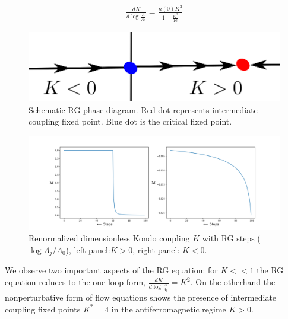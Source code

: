 \documentclass[aps,prl,preprint,groupedaddress]{revtex4-2}
\begin{document}
\begin{eqnarray}
\frac{d K}{d\log\frac{\Lambda}{\Lambda_{0}}}=\frac{n(0)K^{2}}{1-\frac{K^{2}}{16}}
\end{eqnarray}
\begin{figure}[h!]
\centering
\includegraphics[scale=0.6]{Kondo.png}
\caption{Schematic RG phase diagram. Red dot represents intermediate coupling fixed point. Blue dot is the critical fixed point.} 
\end{figure}
\begin{figure}
\centering
\includegraphics[width=\textwidth]{RG_Flow.png}
\caption{Renormalized dimensionless Kondo coupling $K$ with RG steps ($\log\Lambda_{j}/\Lambda_{0}$), left panel:$K>0$, right panel: $K<0$.} 
\end{figure}
We observe two important aspects of the RG equation: for $K<<1$ the RG equation reduces to the one loop form, $\frac{d K}{d\log\frac{\Lambda}{\Lambda_{0}}}=K^{2}$\cite{anderson1970poor}. On the otherhand the nonperturbative form of flow equations shows the presence of intermediate coupling fixed points $K^{*}=4$ in the antiferromagnetic regime $K>0$.
\end{document}
